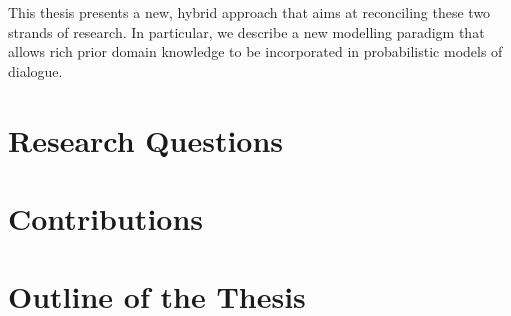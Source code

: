 This thesis presents a new, hybrid approach that aims at reconciling these two strands of research.  In particular, we describe a new modelling paradigm that allows rich prior domain knowledge to be incorporated in probabilistic models of dialogue.

\section{Research Questions}

\section{Contributions}


\section{Outline of the Thesis}

